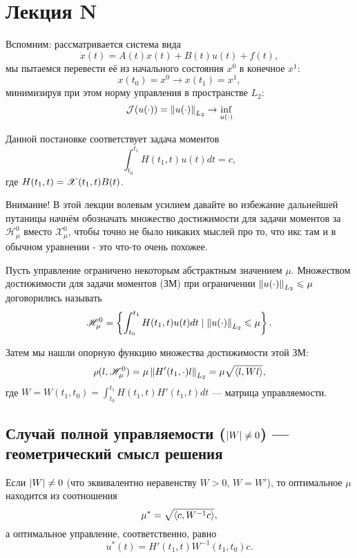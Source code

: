 \chapter{Лекция N}
Вспомним: рассматривается система вида
\begin{equation}
    \dot{x}(t) = A(t) x(t) + B(t) u (t) + f(t),
\end{equation}
мы пытаемся перевести её из начального состояния $x^0$ в конечное $x^1$:
\begin{equation}
    x(t_0) = x^0 \to x(t_1) = x^1,
\end{equation}
минимизируя при этом норму управления в пространстве $L_2$:
\begin{equation}
    \mathcal{J}(u(\cdot)) = \left\lVert u(\cdot) \right\rVert_{L_2} \to \inf\limits_{u(\cdot)}
\end{equation}

Данной постановке соответствует задача моментов
\begin{equation}\tag{ЗМ}
    \int_{t_0}^{t_1} H(t_1, t) u(t) dt = c,
\end{equation}
где $H(t_1, t) = \mathscr{X}(t_1, t) B(t)$.

\begin{bf}Внимание! В этой лекции волевым усилием давайте во избежание дальнейшей путаницы начнём обозначать множество достижимости для задачи моментов за $\mathscr{H}_{\mu}^0$ вместо $\mathscr{X}_{\mu}^0$, чтобы точно не было никаких мыслей про то, что икс там и в обычном уравнении - это что-то очень похожее.\end{bf}

Пусть управление ограничено некоторым абстрактным значением $\mu$. Множеством достижимости для задачи моментов (ЗМ) при ограничении $\left\lVert u(\cdot) \right\rVert_{L_2} \leqslant \mu$ договорились называть
\begin{equation}
    \mathscr{H}_{\mu}^0 = \left\{ \int_{t_0}^{t_1} H(t_1, t) u(t) dt \mid \left\lVert u(\cdot) \right\rVert_{L_2} \leqslant \mu \right\}.
\end{equation}

Затем мы нашли опорную функцию множества достижимости этой ЗМ:
$$
\rho(l, \mathscr{H}_{\mu}^0) = \mu \left\lVert H'(t_1, \cdot)l \right\rVert_{L_2} = \mu \sqrt{\left < l, Wl \right >},
$$
где $W = W(t_1, t_0) = \int_{t_0}^{t_1} H(t_1, t) H'(t_1, t) dt$ --- матрица управляемости.

\section{Случай полной управляемости ($\left\lvert W \right\rvert \neq 0$) --- геометрический смысл решения}
Если $\left\lvert W \right\rvert \neq 0$ (что эквивалентно неравенству $W > 0$, $W = W'$), то оптимальное $\mu$ находится из соотношения
$$
\mu^* = \sqrt{\left < c, W^{-1}c \right >},
$$
а оптимальное управление, соответственно, равно
$$
u^*(t) = H'(t_1,t) W^{-1}(t_1, t_0) c.
$$

